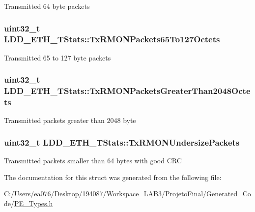 Transmitted 64 byte packets \hypertarget{struct_l_d_d___e_t_h___t_stats_afd6d14f52f7a9646e7a202abd30b4aea}{
\subsubsection[{Tx\-R\-M\-O\-N\-Packets65\-To127\-Octets}]{\setlength{\rightskip}{0pt plus 5cm}uint32\-\_\-t L\-D\-D\-\_\-\-E\-T\-H\-\_\-\-T\-Stats\-::\-Tx\-R\-M\-O\-N\-Packets65\-To127\-Octets}}\label{struct_l_d_d___e_t_h___t_stats_afd6d14f52f7a9646e7a202abd30b4aea}
Transmitted 65 to 127 byte packets \hypertarget{struct_l_d_d___e_t_h___t_stats_a8f892961bd1e66bf6c75e6acec8d8816}{
\subsubsection[{Tx\-R\-M\-O\-N\-Packets\-Greater\-Than2048\-Octets}]{\setlength{\rightskip}{0pt plus 5cm}uint32\-\_\-t L\-D\-D\-\_\-\-E\-T\-H\-\_\-\-T\-Stats\-::\-Tx\-R\-M\-O\-N\-Packets\-Greater\-Than2048\-Octets}}\label{struct_l_d_d___e_t_h___t_stats_a8f892961bd1e66bf6c75e6acec8d8816}
Transmitted packets greater than 2048 byte \hypertarget{struct_l_d_d___e_t_h___t_stats_a71c3b9e66b78d20604a952804089a347}{
\subsubsection[{Tx\-R\-M\-O\-N\-Undersize\-Packets}]{\setlength{\rightskip}{0pt plus 5cm}uint32\-\_\-t L\-D\-D\-\_\-\-E\-T\-H\-\_\-\-T\-Stats\-::\-Tx\-R\-M\-O\-N\-Undersize\-Packets}}\label{struct_l_d_d___e_t_h___t_stats_a71c3b9e66b78d20604a952804089a347}
Transmitted packets smaller than 64 bytes with good C\-R\-C 

The documentation for this struct was generated from the following file\-:\begin{DoxyCompactItemize}
\item 
C\-:/\-Users/ea076/\-Desktop/194087/\-Workspace\-\_\-\-L\-A\-B3/\-Projeto\-Final/\-Generated\-\_\-\-Code/\hyperlink{_p_e___types_8h}{P\-E\-\_\-\-Types.\-h}\end{DoxyCompactItemize}
